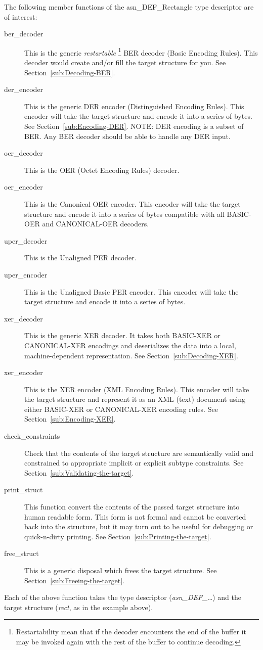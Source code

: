 \documentclass[english,oneside,12pt]{book}
\begin{document}
The following member functions of the asn\_DEF\_Rectangle type descriptor
are of interest:
\begin{description}
\item [{ber\_decoder}] This is the generic \emph{restartable}%
\footnote{Restartability mean that if the decoder encounters the end of the buffer it may be invoked again with the rest of the
buffer to continue decoding.}
BER decoder (Basic Encoding Rules). This decoder would create and/or
fill the target structure for you. See Section~\ref{sub:Decoding-BER}.
\item [{der\_encoder}] This is the generic DER encoder (Distinguished Encoding
Rules). This encoder will take the target structure and encode it
into a series of bytes. See Section~\ref{sub:Encoding-DER}. NOTE:
DER encoding is a subset of BER. Any BER decoder should be able to
handle any DER input.
\item [{oer\_decoder}] This is the OER (Octet Encoding Rules) decoder.
\item [{oer\_encoder}] This is the Canonical OER encoder. This encoder
will take the target structure and encode it into a series of bytes compatible
with all BASIC-OER and CANONICAL-OER decoders.
\item [{uper\_decoder}] This is the Unaligned PER decoder.
\item [{uper\_encoder}] This is the Unaligned Basic PER encoder. This encoder
will take the target structure and encode it into a series of bytes.
\item [{xer\_decoder}] This is the generic XER decoder. It takes both BASIC-XER
or CANONICAL-XER encodings and deserializes the data into a local,
machine-dependent representation. See Section~\ref{sub:Decoding-XER}.
\item [{xer\_encoder}] This is the XER encoder (XML Encoding Rules). This
encoder will take the target structure and represent it as an XML
(text) document using either BASIC-XER or CANONICAL-XER encoding rules.
See Section~\ref{sub:Encoding-XER}.

\item [{check\_constraints}] Check that the contents of the target structure
are semantically valid and constrained to appropriate implicit or
explicit subtype constraints. See Section~\ref{sub:Validating-the-target}.
\item [{print\_struct}] This function convert the contents of the passed
target structure into human readable form. This form is not formal
and cannot be converted back into the structure, but it may turn out
to be useful for debugging or quick-n-dirty printing. See Section~\ref{sub:Printing-the-target}.
\item [{free\_struct}] This is a generic disposal which frees the target
structure. See Section~\ref{sub:Freeing-the-target}.
\end{description}
Each of the above function takes the type descriptor (\emph{asn\_DEF\_\ldots{}})
and the target structure (\emph{rect}, as in the example above).
\end{document}
